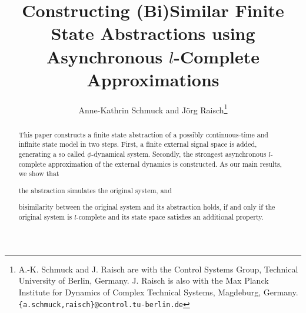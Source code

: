 \documentclass[letterpaper, 11 pt, onecolumn]{ieeeconf}
\title{\LARGE \bf
Constructing (Bi)Similar Finite State Abstractions using Asynchronous $l$-Complete Approximations
}
\author{Anne-Kathrin Schmuck and Jörg Raisch\thanks{A.-K. Schmuck and J. Raisch are with the Control Systems Group, Technical University of Berlin, Germany. J. Raisch is also with the Max Planck Institute
for Dynamics of Complex Technical Systems, Magdeburg, Germany. {\tt\small \{a.schmuck,raisch\}@control.tu-berlin.de}}}
\newcommand{\0}{\ensuremath{\emptyset}}
\newcommand{\signalmap}{\phi}
\begin{document}
\maketitle
\thispagestyle{empty}
\pagestyle{empty}


 \begin{abstract}
This paper constructs a finite state abstraction of a possibly continuous-time and infinite state model in two steps. First, a finite external signal space is added, generating a so called $\signalmap$-dynamical system. Secondly, the strongest asynchronous $l$-complete approximation of the external dynamics is constructed. As our main results, we show that 
\begin{inparaenum}[(i)]
 \item the abstraction simulates the original system, and 
 \item bisimilarity between the original system and its abstraction holds, if and only if the original system is $l$-complete and its state space satisfies an additional property.
\end{inparaenum}
\end{abstract}
\end{document}
